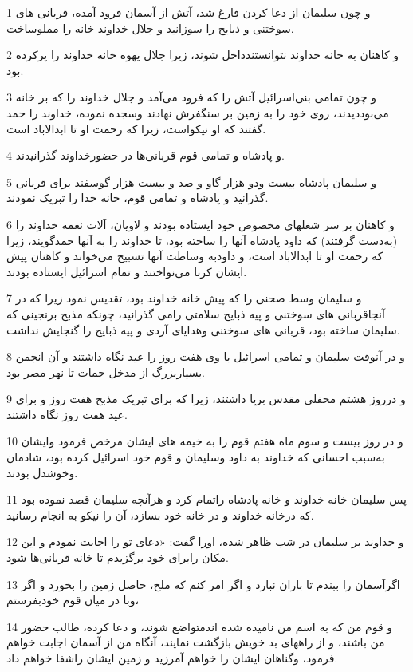 \par 1 و چون سلیمان از دعا کردن فارغ شد، آتش از آسمان فرود آمده، قربانی های سوختنی و ذبایح را سوزانید و جلال خداوند خانه را مملوساخت.
\par 2 و کاهنان به خانه خداوند نتوانستندداخل شوند، زیرا جلال یهوه خانه خداوند را پرکرده بود.
\par 3 و چون تمامی بنی‌اسرائیل آتش را که فرود می‌آمد و جلال خداوند را که بر خانه می‌بوددیدند، روی خود را به زمین بر سنگفرش نهادند وسجده نموده، خداوند را حمد گفتند که او نیکواست، زیرا که رحمت او تا ابدالاباد است.
\par 4 و پادشاه و تمامی قوم قربانی‌ها در حضورخداوند گذرانیدند.
\par 5 و سلیمان پادشاه بیست ودو هزار گاو و صد و بیست هزار گوسفند برای قربانی گذرانید و پادشاه و تمامی قوم، خانه خدا را تبریک نمودند.
\par 6 و کاهنان بر سر شغلهای مخصوص خود ایستاده بودند و لاویان، آلات نغمه خداوند را (به‌دست گرفتند) که داود پادشاه آنها را ساخته بود، تا خداوند را به آنها حمدگویند، زیرا که رحمت او تا ابدالاباد است، و داودبه وساطت آنها تسبیح می‌خواند و کاهنان پیش ایشان کرنا می‌نواختند و تمام اسرائیل ایستاده بودند.
\par 7 و سلیمان وسط صحنی را که پیش خانه خداوند بود، تقدیس نمود زیرا که در آنجاقربانی های سوختنی و پیه ذبایح سلامتی رامی گذرانید، چونکه مذبح برنجینی که سلیمان ساخته بود، قربانی های سوختنی وهدایای آردی و پیه ذبایح را گنجایش نداشت.
\par 8 و در آنوقت سلیمان و تمامی اسرائیل با وی هفت روز را عید نگاه داشتند و آن انجمن بسیاربزرگ از مدخل حمات تا نهر مصر بود.
\par 9 و درروز هشتم محفلی مقدس برپا داشتند، زیرا که برای تبریک مذبح هفت روز و برای عید هفت روز نگاه داشتند.
\par 10 و در روز بیست و سوم ماه هفتم قوم را به خیمه های ایشان مرخص فرمود وایشان به‌سبب احسانی که خداوند به داود وسلیمان و قوم خود اسرائیل کرده بود، شادمان وخوشدل بودند. 
\par 11 پس سلیمان خانه خداوند و خانه پادشاه راتمام کرد و هرآنچه سلیمان قصد نموده بود که درخانه خداوند و در خانه خود بسازد، آن را نیکو به انجام رسانید.
\par 12 و خداوند بر سلیمان در شب ظاهر شده، اورا گفت: «دعای تو را اجابت نمودم و این مکان رابرای خود برگزیدم تا خانه قربانی‌ها شود.
\par 13 اگرآسمان را ببندم تا باران نبارد و اگر امر کنم که ملخ، حاصل زمین را بخورد و اگر وبا در میان قوم خودبفرستم،
\par 14 و قوم من که به اسم من نامیده شده اندمتواضع شوند، و دعا کرده، طالب حضور من باشند، و از راههای بد خویش بازگشت نمایند، آنگاه من از آسمان اجابت خواهم فرمود، وگناهان ایشان را خواهم آمرزید و زمین ایشان راشفا خواهم داد.
